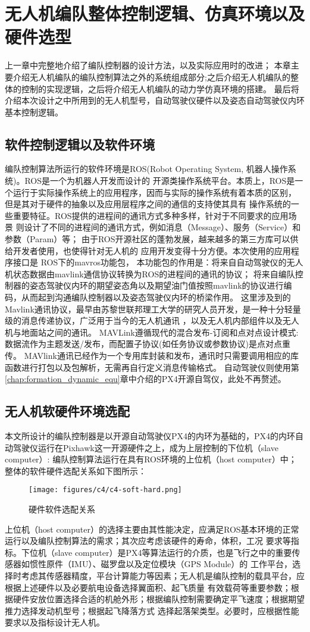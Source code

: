 \chapter{无人机编队整体控制逻辑、仿真环境以及硬件选型}
\label{chap:hardware}
上一章中完整地介绍了编队控制器的设计方法，以及实际应用时的改进；
本章主要介绍无人机编队的编队控制算法之外的系统组成部分;之后介绍无人机编队的整体的控制的实现逻辑，之后将介绍无人机编队的动力学仿真环境的搭建。
最后将介绍本次设计之中所用到的无人机型号，自动驾驶仪硬件以及姿态自动驾驶仪内环基本控制逻辑。
\section{ 软件控制逻辑以及软件环境 }
编队控制算法所运行的软件环境是ROS(Robot Operating System, 机器人操作系统)。ROS是一个为机器人开发而设计的
开源类操作系统平台。本质上，ROS是一个运行于实际操作系统上的应用程序，因而与实际的操作系统有着本质的区别，
但是其对于硬件的抽象以及应用层程序之间的通信的支持使其具有
操作系统的一些重要特征。ROS提供的进程间的通讯方式多种多样，针对于不同要求的应用场景
则设计了不同的进程间的通讯方式，例如消息（Message）、服务（Service）和参数（Param）等；
由于ROS开源社区的蓬勃发展，越来越多的第三方库可以供给开发者使用，也使得针对无人机的
应用开发变得十分方便。本次使用的应用程序接口是
ROS下的mavros功能包，
本功能包的作用是：将来自自动驾驶仪的无人机状态数据由mavlink通信协议转换为ROS的进程间的通讯的协议；
将来自编队控制器的姿态驾驶仪内环的期望姿态角以及期望油门值按照mavlink的协议进行编码，从而起到沟通编队控制器以及姿态驾驶仪内环的桥梁作用。
这里涉及到的Mavlink通讯协议，最早由苏黎世联邦理工大学的研究人员开发，是一种十分轻量级的消息传递协议，广泛用于当今的无人机通讯
，以及无人机内部组件以及无人机与地面站之间的通讯。
MAVLink遵循现代的混合发布-订阅和点对点设计模式:数据流作为主题发送/发布，而配置子协议(如任务协议或参数协议)是点对点重传。
MAVlink通讯已经作为一个专用库封装和发布，通讯时只需要调用相应的库函数进行打包以及包解析，无需再自行定义消息传输格式。
自动驾驶仪则使用第\ref{chap:formation_dynamic_equ}章中介绍的PX4开源自驾仪，此处不再赘述。
\section{无人机软硬件环境选配}
本文所设计的编队控制器是以开源自动驾驶仪PX4的内环为基础的，PX4的内环自动驾驶仪运行在Pixhawk这一开源硬件之上，成为上层控制的下位机（slave computer）:
编队控制算法运行在具有ROS环境的上位机（host computer）中；
整体的软件硬件选配关系如下图所示：
\begin{figure}[H]
    \centering
    \texttt{[image: figures/c4/c4-soft-hard.png]}
    \caption{硬件软件选配关系}\label{fig:c4-soft-hard.png}
\end{figure}
上位机（host computer）的选择主要由其性能决定，应满足ROS基本环境的正常运行以及编队控制算法的需求；其次应考虑该硬件的寿命，体积，工况
要求等指标。下位机（slave computer）是PX4等算法运行的介质，也是飞行之中的重要传感器如惯性原件（IMU）、磁罗盘以及定位模块（GPS Module）的
工作平台，选择时考虑其传感器精度，平台计算能力等因素；无人机是编队控制的载具平台，应根据上述硬件以及必要航电设备选择翼面积、起飞质量
有效载荷等重要参数；根据硬件安放位置选择合适的机舱外形；根据编队控制需要确定平飞速度；根据期望推力选择发动机型号；根据起飞降落方式
选择起落架类型。必要时，应根据性能要求以及指标设计无人机。

